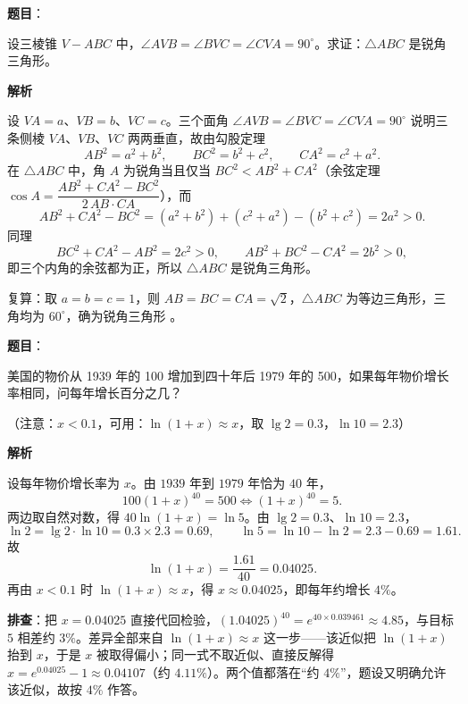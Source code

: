 \begin{answer}

\textbf{题目}：

设三棱锥 $V-ABC$ 中，$\angle AVB=\angle BVC=\angle CVA=90^\circ$。求证：$\triangle ABC$ 是锐角三角形。

\textbf{解析}

设 $VA=a$、$VB=b$、$VC=c$。三个面角 $\angle AVB=\angle BVC=\angle CVA=90^\circ$ 说明三条侧棱 $VA$、$VB$、$VC$ 两两垂直，故由勾股定理
\nopagebreak[4]
\[
AB^2=a^2+b^2,\qquad BC^2=b^2+c^2,\qquad CA^2=c^2+a^2.
\]
在 $\triangle ABC$ 中，角 $A$ 为锐角当且仅当 $BC^2<AB^2+CA^2$（余弦定理 $\cos A=\dfrac{AB^2+CA^2-BC^2}{2\,AB\cdot CA}$），而
\nopagebreak[4]
\[
AB^2+CA^2-BC^2=(a^2+b^2)+(c^2+a^2)-(b^2+c^2)=2a^2>0.
\]
同理
\nopagebreak[4]
\[
BC^2+CA^2-AB^2=2c^2>0,\qquad AB^2+BC^2-CA^2=2b^2>0,
\]
即三个内角的余弦都为正，所以 $\triangle ABC$ 是锐角三角形。

复算：取 $a=b=c=1$，则 $AB=BC=CA=\sqrt2$，$\triangle ABC$ 为等边三角形，三角均为 $60^\circ$，确为锐角三角形 。


\end{answer}
\begin{answer}

\textbf{题目}：

美国的物价从 1939 年的 100 增加到四十年后 1979 年的 500，如果每年物价增长率相同，问每年增长百分之几？

（注意：$x<0.1$，可用：$\ln(1+x)\approx x$，取 $\lg2=0.3$，$\ln10=2.3$）

\textbf{解析}

设每年物价增长率为 $x$。由 $1939$ 年到 $1979$ 年恰为 $40$ 年，
\nopagebreak[4]
\[
100(1+x)^{40}=500\iff(1+x)^{40}=5.
\]
两边取自然对数，得 $40\ln(1+x)=\ln5$。由 $\lg2=0.3$、$\ln10=2.3$，
\nopagebreak[4]
\[
\ln2=\lg2\cdot\ln10=0.3\times2.3=0.69,
\qquad
\ln5=\ln10-\ln2=2.3-0.69=1.61.
\]
故
\nopagebreak[4]
\[
\ln(1+x)=\frac{1.61}{40}=0.04025.
\]
再由 $x<0.1$ 时 $\ln(1+x)\approx x$，得 $x\approx0.04025$，即每年约增长 $4\%$。

\textbf{排查}：把 $x=0.04025$ 直接代回检验，$(1.04025)^{40}=e^{40\times0.039461}\approx4.85$，与目标 $5$ 相差约 $3\%$。差异全部来自 $\ln(1+x)\approx x$ 这一步——该近似把 $\ln(1+x)$ 抬到 $x$，于是 $x$ 被取得偏小；同一式不取近似、直接反解得 $x=e^{0.04025}-1\approx0.04107$（约 $4.11\%$）。两个值都落在“约 $4\%$”，题设又明确允许该近似，故按 $4\%$ 作答。


\end{answer}
